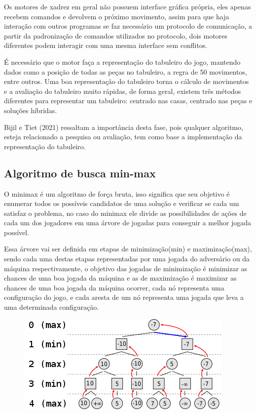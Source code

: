 Os motores de xadrez em geral não possuem interface gráfica própria, eles apenas recebem comandos e devolvem o próximo
movimento, assim para que haja interação com outros programas se faz necessário um protocolo de comunicação, a partir
da padronização de comandos utilizados no protocolo, dois motores diferentes podem interagir com uma mesma interface
sem conflitos.

É necessário que o motor faça a representação do tabuleiro do jogo, mantendo dados como a posição de todas as peças no tabuleiro,
a regra de 50 movimentos, entre outros. Uma boa representação do tabuleiro torna o cálculo de movimentos e a avaliação do tabuleiro
muito rápidas, de forma geral, existem três métodos diferentes para representar um tabuleiro: centrado nas casas, centrado nas peças
e soluções híbridas.

Bijil e Tiet (2021) ressaltam a importância desta fase, pois qualquer algoritmo, esteja relacionado a pesquisa
ou avaliação, tem como base a implementação da representação do tabuleiro.

\subsection{Algoritmo de busca min-max}

O minimax é um algoritmo de força bruta, isso significa que seu objetivo é enumerar todos os possíveis candidatos de uma solução e verificar
se cada um satisfaz o problema, no caso do minimax ele divide as possibilidades de ações de cada um dos jogadores em uma árvore de jogadas para
conseguir a melhor jogada possível.

Essa árvore vai ser definida em etapas de minimização(min) e maximização(max), sendo cada uma destas etapas representadas por uma jogada do
adversário ou da máquina respectivamente, o objetivo das jogadas de minimização é minimizar as chances de uma boa jogada da máquina e as de
maximização é maximizar as chances de uma boa jogada da máquina ocorrer, cada nó representa uma configuração do jogo, e cada aresta de um nó representa
uma jogada que leva a uma determinada configuração.
\begin{figure}[!htb]
    \centering
    \label{minimax}
    \includegraphics[scale=0.8]{figuras/minimax2.png}
\end{figure}

